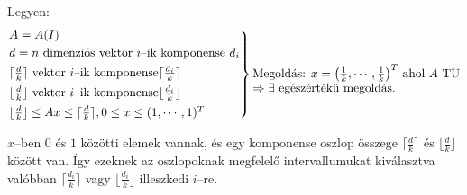 Legyen:
\[\begin{rcases}
A=A(I) \\
d = n \text{ dimenziós vektor } i \text{--ik komponense } d_i \\
\lceil \frac{d}{k} \rceil \text{ vektor } i \text{--ik komponense} \lceil \frac{d_i}{k} \rceil \\
\lfloor \frac{d}{k} \rfloor \text{ vektor } i \text{--ik komponense} \lfloor \frac{d_i}{k} \rfloor \\
\lfloor \frac{d}{k} \rfloor \leq Ax \leq \lceil \frac{d}{k} \rceil, 0 \leq x \leq (1,\cdots, 1)^T
\end{rcases} \parbox[t]{6cm}{Megoldás: $x=\left( \frac{1}{k}, \cdots, \frac{1}{k} \right)^T$ ahol $A$
TU $\Rightarrow \exists$ egészértékű megoldás.} 
\]

$x$--ben $0$ és $1$ közötti elemek vannak, és egy komponense oszlop összege
$\lceil \frac{d}{k} \rceil$ és $ \lfloor \frac{d}{k} \rfloor$ között van. Így
ezeknek az oszlopoknak megfelelő intervallumukat kiválasztva valóbban $\lceil
\frac{d_i}{k} \rceil$ vagy $ \lfloor \frac{d_i}{k} \rfloor$ illeszkedi $i$--re.
